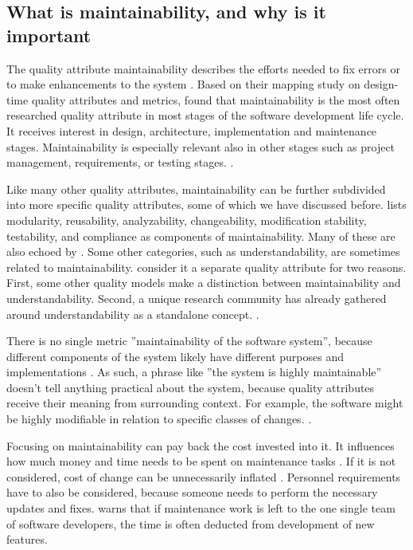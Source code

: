 \documentclass[utf8,english]{gradu3}
\begin{document}
\subsection{What is maintainability, and why is it important}

The quality attribute maintainability describes the efforts needed to
fix errors or to make enhancements to the system \parencite[603]{Gorla2010}.
Based on their mapping study on design-time quality attributes and metrics,
\textcite{Arvanitou2017} found that maintainability is the most often researched
quality attribute in most stages of the software development life cycle. It
receives interest in design, architecture, implementation and maintenance
stages. Maintainability is especially relevant also in other stages such as project
management, requirements, or testing stages. \parencite[61-62]{Arvanitou2017}.

Like many other quality attributes, maintainability can be further subdivided
into more specific quality attributes, some of which we have discussed before.
\textcite[233]{ISO5055} lists modularity, reusability, analyzability,
changeability, modification stability, testability,
and compliance as components of maintainability. Many of these are also
echoed by \textcite[61]{Arvanitou2017}. Some other categories, such as
understandability, are sometimes related to maintainability.
\textcite{Arvanitou2017} consider it a separate quality attribute for two
reasons. First, some other quality models make a distinction between
maintainability and understandability. Second, a unique research community has
already gathered around understandability as a standalone concept.
\parencite[61]{Arvanitou2017}.

There is no single metric ''maintainability of the software system'', because
different components of the system likely have different purposes and implementations
\parencites[26]{Broy2006}[192]{Bass1998}. As such, a phrase like ''the system is
highly maintainable'' doesn't tell anything practical about the system, because
quality attributes receive their meaning from surrounding context. For example,
the software might be highly modifiable in relation to specific classes of
changes. \parencite[192]{Bass1998}.

Focusing on maintainability can pay back the cost invested into it. It
influences how much money and time needs to be spent on maintenance tasks
\parencite[21]{Broy2006}. If it is not considered, cost of change can be
unnecessarily inflated \parencite[2]{Vale2022}. Personnel requirements have to
also be considered, because someone needs to perform the necessary updates and
fixes. \textcite{Heroku2011} warns that if maintenance work is left to the one
single team of software developers, the time is often deducted from development
of new features.
\end{document}

